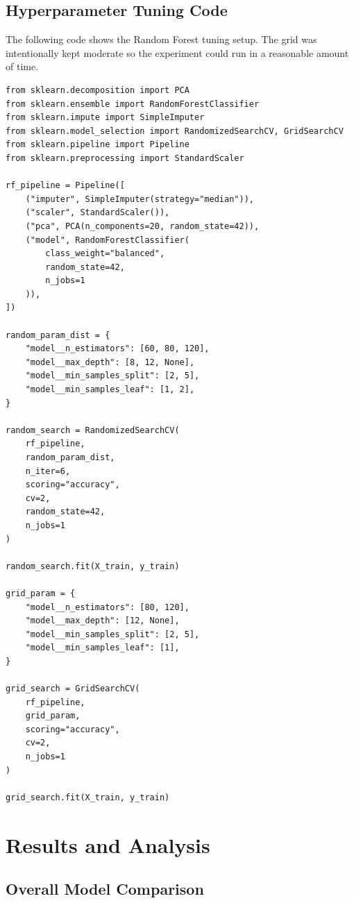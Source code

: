 \documentclass[12pt,a4paper]{article}
\begin{document}
\subsection{Hyperparameter Tuning Code}

The following code shows the Random Forest tuning setup. The grid was intentionally kept moderate so the experiment could run in a reasonable amount of time.

\begin{lstlisting}
from sklearn.decomposition import PCA
from sklearn.ensemble import RandomForestClassifier
from sklearn.impute import SimpleImputer
from sklearn.model_selection import RandomizedSearchCV, GridSearchCV
from sklearn.pipeline import Pipeline
from sklearn.preprocessing import StandardScaler

rf_pipeline = Pipeline([
    ("imputer", SimpleImputer(strategy="median")),
    ("scaler", StandardScaler()),
    ("pca", PCA(n_components=20, random_state=42)),
    ("model", RandomForestClassifier(
        class_weight="balanced",
        random_state=42,
        n_jobs=1
    )),
])

random_param_dist = {
    "model__n_estimators": [60, 80, 120],
    "model__max_depth": [8, 12, None],
    "model__min_samples_split": [2, 5],
    "model__min_samples_leaf": [1, 2],
}

random_search = RandomizedSearchCV(
    rf_pipeline,
    random_param_dist,
    n_iter=6,
    scoring="accuracy",
    cv=2,
    random_state=42,
    n_jobs=1
)

random_search.fit(X_train, y_train)

grid_param = {
    "model__n_estimators": [80, 120],
    "model__max_depth": [12, None],
    "model__min_samples_split": [2, 5],
    "model__min_samples_leaf": [1],
}

grid_search = GridSearchCV(
    rf_pipeline,
    grid_param,
    scoring="accuracy",
    cv=2,
    n_jobs=1
)

grid_search.fit(X_train, y_train)
\end{lstlisting}

\section{Results and Analysis}

\subsection{Overall Model Comparison}
\end{document}
